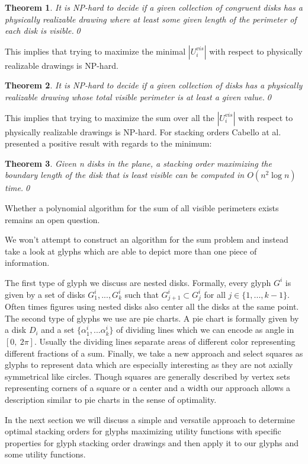 \documentclass[a4paper,11pt]{article}
\newtheorem{theorem}{Theorem}
\begin{document}
\begin{theorem}
  It is NP-hard to decide if a given collection of congruent disks has a
  physically realizable drawing where at least some given length of the perimeter of
  each disk is visible.\qed
\end{theorem}
This implies that trying to maximize the minimal $|U_i^{vis}|$ with respect to physically realizable drawings is NP-hard.
\begin{theorem}
  It is NP-hard to decide if a given collection of disks has a physically
  realizable drawing whose total visible perimeter is at least a given value.\qed
\end{theorem}
This implies that trying to maximize the sum over all the $|U_i^{vis}|$ with respect to physically realizable drawings is NP-hard.
For stacking orders Cabello at al. presented a positive result with regards to the minimum:
\begin{theorem}
  Given n disks in the plane, a stacking order maximizing the boundary
  length of the disk that is least visible can be computed in $O(n^2 \log n)$ time.\qed
\end{theorem}

Whether a polynomial algorithm for the sum of all visible perimeters exists remains an open question.

We won't attempt to construct an algorithm for the sum problem and instead take a look at glyphs which are able to depict more than one piece of information.

The first type of glyph we discuss are nested disks. Formally, every glyph $G^i$ is given by a set of disks $G^i_1,...,G^i_k$ such that $G^i_{j+1}\subset G^i_j$ for all $j\in \{1,...,k-1 \}$. Often times figures using nested disks also center all the disks at the same point.
The second type of glyphs we use are pie charts. A pie chart is formally given by a disk $D_i$ and a set $\{\alpha_1^i,...\alpha_k^i\}$ of dividing lines which we can encode as angle in $[0,\ 2\pi]$. Usually the dividing lines separate areas of different color representing different fractions of a sum.
Finally, we take a new approach and select squares as glyphs to represent data which are especially interesting as they are not axially symmetrical like circles. Though squares are generally described by vertex sets representing corners of a square or a center and a width our approach allows a description similar to pie charts in the sense of optimality.

In the next section we will discuss a simple and versatile approach to determine optimal stacking orders for glyphs maximizing utility functions with specific properties for glyph stacking order drawings and then apply it to our glyphs and some utility functions.
\end{document}
